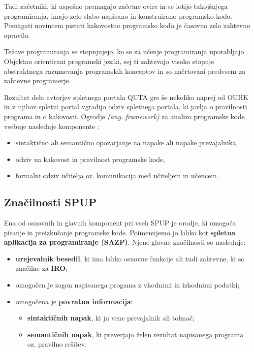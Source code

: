 Tudi začetniki, ki uspešno premagajo začetne ovire in se lotijo
takojšnjega programiranja, imajo zelo slabo napisano in konstruirano
programsko kodo. Pomagati novincem pistati kakovostno programsko kodo
je časovno zelo zahtevno opravilo.

Težave programiranja se stopnjujejo, ko se za učenje programiranja
uporabljajo Objektno orientirani programski jeziki, sej ti zahtevajo
visoko stopnjo abstraktnega razumevanja programskih konceptov in so
načrtovani predvsem za zahtevne programerje.


Rezultat dela avtorjev spletnega portala QUTA gre še nekoliko naprej
od OUHK in v njihov spletni portal vgradijo odziv spletnega portala,
ki javlja o pravilnosti programa in o kakovosti. Ogrodje
\emph{(ang. framework)} za analizo programske kode vsebuje naslednje
komponente \cite{thesisAWebP}:

\begin{itemize}
\tightlist
\item
  sintaktično ali semantično opozarjanje na napake ali napake
  prevajalnika,
\item
  odziv na kakovost in pravilnost programske kode,
\item
  formalni odziv učitelja oz. komunikacija med učiteljem in učencem.
\end{itemize}

\subsection{Značilnosti SPUP}
\label{sec:značilnosti_spup}

Ena od osnovnih in glavnih komponent pri vseh SPUP je orodje, ki
omogoča pisanje in preizkušanje programske kode. Poimenujemo jo lahko
kot \textbf{spletna aplikacija za programiranje (SAZP)}. Njene
glavne značilnosti so naslednje:

\begin{itemize}
  \item \textbf{urejevalnik besedil}, ki ima lahko osnovne funkcije ali tudi
  zahtevne, ki so značilne za \textbf{IRO};
\item omogočen je zagon napisanega progama z vhodnimi in izhodnimi
  podatki;
\item omogočena je \textbf{povratna informacija}:
  \begin{itemize}
    \tightlist
  \item \textbf{sintaktičnih napak}, ki ju vrne prevajalnik ali tolmač;
  \item \textbf{semantičnih napak}, ki preverjajo želen rezultat napisanega
    programa oz. pravilno rešitev.
  \end{itemize}
\end{itemize}

